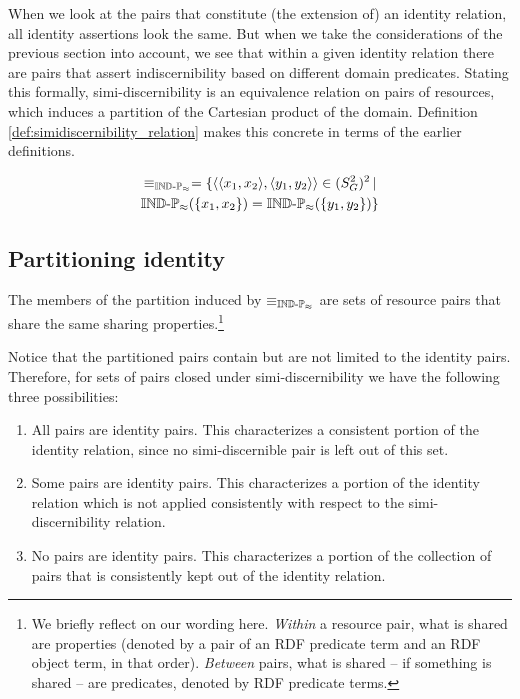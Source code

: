 When we look at the pairs that constitute (the extension of)
  an identity relation, all identity assertions look the same.
But when we take the considerations of the previous section into account,
  we see that within a given identity relation
  there are pairs that assert indiscernibility
  based on different domain predicates.
Stating this formally,
  simi-discernibility is an equivalence relation on pairs of resources,
  which induces a partition of the Cartesian product of the domain.
Definition \ref{def:simidiscernibility_relation} makes this concrete
  in terms of the earlier definitions.

\begin{definition}
\label{def:simidiscernibility_relation}
\begin{align}
  \equiv_{\operatorname{{\mathbb{IND}-\mathbb{P}}}_{\approx}}
=
  \{
    \langle\langle x_1,x_2\rangle,\langle y_1,y_2\rangle\rangle \in (S_G^2)^2
  \,\vert\,\nonumber\\
    \operatorname{{\mathbb{IND}-\mathbb{P}}}_{\approx}(\{x_1,x_2\}) = \operatorname{{\mathbb{IND}-\mathbb{P}}}_{\approx}(\{y_1,y_2\})
  \}\nonumber
\end{align}
\end{definition}



\subsection{Partitioning identity}

The members of the partition induced by $\equiv_{\operatorname{{\mathbb{IND}-\mathbb{P}}}_{\approx}}$
  are sets of resource pairs that share the same sharing properties.\footnote{
    We briefly reflect on our wording here.
    \emph{Within} a resource pair, what is shared are properties
      (denoted by a pair of an RDF predicate term and an RDF object term,
      in that order).
    \emph{Between} pairs, what is shared -- if something is shared --
      are predicates, denoted by RDF predicate terms.
  }

Notice that the partitioned pairs contain but are not limited to
  the identity pairs.
Therefore, for sets of pairs closed under simi-discernibility
  we have the following three possibilities:
  \begin{enumerate}
    \item All pairs are identity pairs.
          This characterizes a consistent portion of the identity relation,
          since no simi-discernible pair is left out of this set.
    \item Some pairs are identity pairs.
          This characterizes a portion of the identity relation which is not
          applied consistently with respect to
          the simi-discernibility relation.
    \item No pairs are identity pairs.
          This characterizes a portion of the collection of pairs
          that is consistently kept out of the identity relation.
  \end{enumerate}

